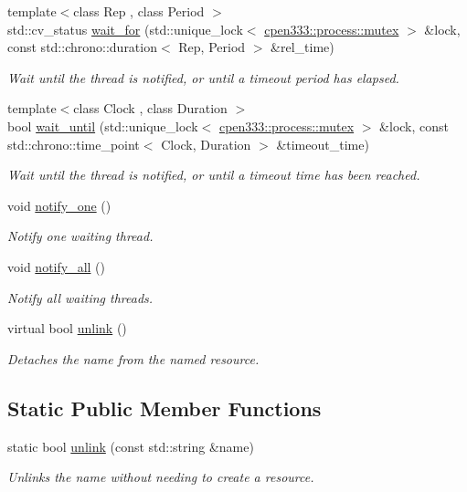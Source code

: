\begin{DoxyCompactItemize}
{\footnotesize template$<$class Rep , class Period $>$ }\\std\+::cv\+\_\+status \hyperlink{classcpen333_1_1process_1_1condition__base_a2243e72e2205c31851d2c16eddb9b54f}{wait\+\_\+for} (std\+::unique\+\_\+lock$<$ \hyperlink{classcpen333_1_1process_1_1mutex}{cpen333\+::process\+::mutex} $>$ \&lock, const std\+::chrono\+::duration$<$ Rep, Period $>$ \&rel\+\_\+time)
\begin{DoxyCompactList}\small\item\em Wait until the thread is notified, or until a timeout period has elapsed. \end{DoxyCompactList}\item 
{\footnotesize template$<$class Clock , class Duration $>$ }\\bool \hyperlink{classcpen333_1_1process_1_1condition__base_a6af33a75565bf4177cb6616a08acaac0}{wait\+\_\+until} (std\+::unique\+\_\+lock$<$ \hyperlink{classcpen333_1_1process_1_1mutex}{cpen333\+::process\+::mutex} $>$ \&lock, const std\+::chrono\+::time\+\_\+point$<$ Clock, Duration $>$ \&timeout\+\_\+time)
\begin{DoxyCompactList}\small\item\em Wait until the thread is notified, or until a timeout time has been reached. \end{DoxyCompactList}\item 
void \hyperlink{classcpen333_1_1process_1_1condition__base_a990220c8ee064b3d494cdbf238ceb73e}{notify\+\_\+one} ()
\begin{DoxyCompactList}\small\item\em Notify one waiting thread. \end{DoxyCompactList}\item 
void \hyperlink{classcpen333_1_1process_1_1condition__base_a37b38d480898c0cc13b0ea1eb2b24127}{notify\+\_\+all} ()
\begin{DoxyCompactList}\small\item\em Notify all waiting threads. \end{DoxyCompactList}\item 
virtual bool \hyperlink{classcpen333_1_1process_1_1condition__base_acd6d0b53a828aa161ccad06885eaa15c}{unlink} ()
\begin{DoxyCompactList}\small\item\em Detaches the name from the named resource. \end{DoxyCompactList}\end{DoxyCompactItemize}
\subsection*{Static Public Member Functions}
\begin{DoxyCompactItemize}
\item 
static bool \hyperlink{classcpen333_1_1process_1_1condition__base_a01ed2d247732584166613527ea8e1aff}{unlink} (const std\+::string \&name)
\begin{DoxyCompactList}\small\item\em Unlinks the name without needing to create a resource. \end{DoxyCompactList}\end{DoxyCompactItemize}
